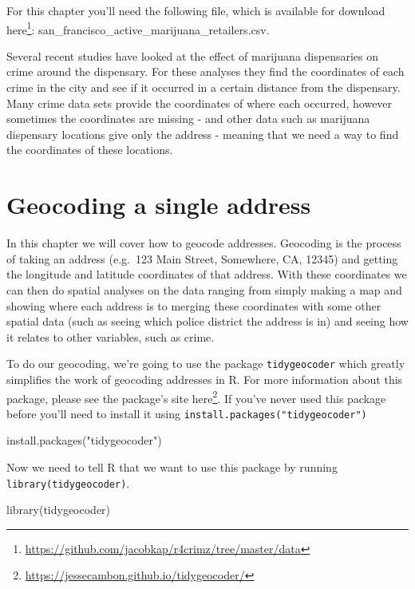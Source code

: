 \documentclass[
]{krantz}
\makeatletter
\newenvironment{Shaded}{\begin{snugshade}}{\end{snugshade}}
\newcommand{\FunctionTok}[1]{\textcolor[rgb]{0,0,0}{#1}}
\newcommand{\NormalTok}[1]{#1}
\newcommand{\StringTok}[1]{\textcolor[rgb]{0.5,0.5,0.5}{#1}}
\renewcommand{\href}[2]{#2\footnote{\url{#1}}}
\newenvironment{kframe}{%
\medskip{}
\setlength{\fboxsep}{.8em}
 \def\at@end@of@kframe{}%
 \ifinner\ifhmode%
  \def\at@end@of@kframe{\end{minipage}}%
  \begin{minipage}{\columnwidth}%
 \fi\fi%
 \def\FrameCommand##1{\hskip\@totalleftmargin \hskip-\fboxsep
 \colorbox{shadecolor}{##1}\hskip-\fboxsep
     \hskip-\linewidth \hskip-\@totalleftmargin \hskip\columnwidth}%
 \MakeFramed {\advance\hsize-\width
   \@totalleftmargin\z@ \linewidth\hsize
   \@setminipage}}%
 {\par\unskip\endMakeFramed%
 \at@end@of@kframe}
\renewenvironment{Shaded}{\begin{kframe}}{\end{kframe}}
\makeatother
\begin{document}
For this chapter you'll need the following file, which is available for download \href{https://github.com/jacobkap/r4crimz/tree/master/data}{here}: san\_francisco\_active\_marijuana\_retailers.csv.

Several recent studies have looked at the effect of marijuana dispensaries on crime around the dispensary. For these analyses they find the coordinates of each crime in the city and see if it occurred in a certain distance from the dispensary. Many crime data sets provide the coordinates of where each occurred, however sometimes the coordinates are missing - and other data such as marijuana dispensary locations give only the address - meaning that we need a way to find the coordinates of these locations.

\hypertarget{geocoding-a-single-address}{%
\section{Geocoding a single address}\label{geocoding-a-single-address}}

In this chapter we will cover how to geocode addresses. Geocoding is the process of taking an address (e.g.~123 Main Street, Somewhere, CA, 12345) and getting the longitude and latitude coordinates of that address. With these coordinates we can then do spatial analyses on the data ranging from simply making a map and showing where each address is to merging these coordinates with some other spatial data (such as seeing which police district the address is in) and seeing how it relates to other variables, such as crime.

To do our geocoding, we're going to use the package \texttt{tidygeocoder} which greatly simplifies the work of geocoding addresses in R. For more information about this package, please see the package's site \href{https://jessecambon.github.io/tidygeocoder/}{here}. If you've never used this package before you'll need to install it using \texttt{install.packages("tidygeocoder")}

\begin{Shaded}
\begin{Highlighting}[]
\FunctionTok{install.packages}\NormalTok{(}\StringTok{"tidygeocoder"}\NormalTok{)}
\end{Highlighting}
\end{Shaded}

Now we need to tell R that we want to use this package by running \texttt{library(tidygeocoder)}.

\begin{Shaded}
\begin{Highlighting}[]
\FunctionTok{library}\NormalTok{(tidygeocoder)}
\end{Highlighting}
\end{Shaded}
\end{document}
